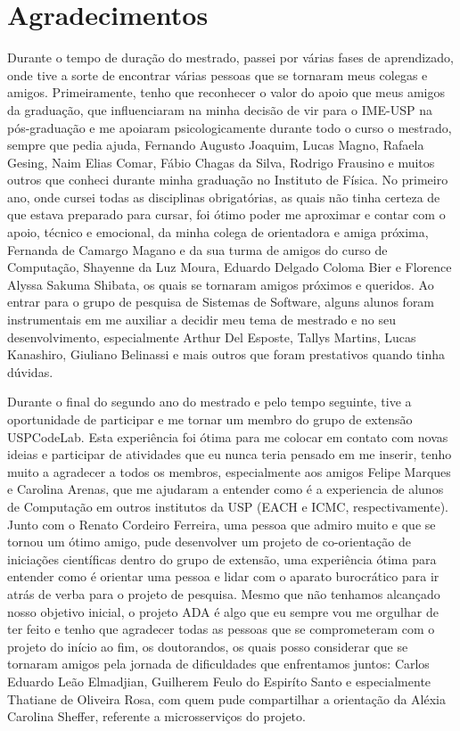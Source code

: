 \documentclass[11pt,twoside,a4paper]{book}
\begin{document}
 \chapter*{Agradecimentos}
 Durante o tempo de duração do mestrado, passei por várias fases de aprendizado, onde tive a sorte de encontrar várias pessoas que se tornaram meus colegas e amigos. Primeiramente, tenho que reconhecer o valor do apoio que meus amigos da graduação, que influenciaram na minha decisão de vir para o IME-USP na pós-graduação e me apoiaram psicologicamente durante todo o curso o mestrado, sempre que pedia ajuda, Fernando Augusto Joaquim, Lucas Magno, Rafaela Gesing, Naim Elias Comar, Fábio Chagas da Silva, Rodrigo Frausino e muitos outros que conheci durante minha graduação no Instituto de Física. No primeiro ano, onde cursei todas as disciplinas obrigatórias, as quais não tinha certeza de que estava preparado para cursar, foi ótimo poder me aproximar e contar com o apoio, técnico e emocional, da minha colega de orientadora e amiga próxima, Fernanda de Camargo Magano e da sua turma de amigos do curso de Computação, Shayenne da Luz Moura, Eduardo Delgado Coloma Bier e Florence Alyssa Sakuma Shibata, os quais se tornaram amigos próximos e queridos. Ao entrar para o grupo de pesquisa de Sistemas de Software, alguns alunos foram instrumentais em me auxiliar a decidir meu tema de mestrado e no seu desenvolvimento, especialmente Arthur Del Esposte, Tallys Martins, Lucas Kanashiro, Giuliano Belinassi e mais outros que foram prestativos quando tinha dúvidas. 
 
 Durante o final do segundo ano do mestrado e pelo tempo seguinte, tive a oportunidade de participar e me tornar um membro do grupo de extensão USPCodeLab. Esta experiência foi ótima para me colocar em contato com novas ideias e participar de atividades que eu nunca teria pensado em me inserir, tenho muito a agradecer a todos os membros, especialmente aos amigos  Felipe Marques e Carolina Arenas, que me ajudaram a entender como é a experiencia de alunos de Computação em outros institutos da USP (EACH e ICMC, respectivamente). Junto com o Renato Cordeiro Ferreira, uma pessoa que admiro muito e que se tornou um ótimo amigo, pude desenvolver um projeto de co-orientação de iniciações científicas dentro do grupo de extensão, uma experiência ótima para entender como é orientar uma pessoa e lidar com o aparato burocrático para ir atrás de verba para o projeto de pesquisa. Mesmo que não tenhamos alcançado nosso objetivo inicial, o projeto ADA é algo que eu sempre vou me orgulhar de ter feito e tenho que agradecer todas as pessoas que se comprometeram com o projeto do início ao fim, os doutorandos, os quais posso considerar que se tornaram amigos pela jornada de dificuldades que enfrentamos juntos: Carlos Eduardo Leão Elmadjian, Guilherem Feulo do Espiríto Santo e especialmente Thatiane de Oliveira Rosa, com quem pude compartilhar a orientação da Aléxia Carolina Sheffer, referente a microsserviços do projeto.
 
\end{document}

